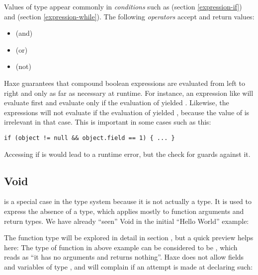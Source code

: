 Values of type  appear commonly in \emph{conditions} such as  (section \ref{expression-if}) and  (section \ref{expression-while}). The following \emph{operators} accept and return  values:
\begin{itemize}
	\item \expr{\&\&} (and)
	\item \expr{||} (or)
	\item \expr{!} (not)
\end{itemize}
Haxe guarantees that compound boolean expressions are evaluated from left to right and only as far as necessary at runtime. For instance, an expression like  will evaluate  first and evaluate  only if the evaluation of  yielded . Likewise, the expressions  will not evaluate  if the evaluation of  yielded , because the value of  is irrelevant in that case.
This is important in some cases such as this:

\begin{lstlisting}
if (object != null && object.field == 1) { ... }
\end{lstlisting}
Accessing  if  is  would lead to a runtime error, but the check for  guards against it.




\subsection{Void}
\label{types-void}


 is a special case in the type system because it is not actually a type. It is used to express the absence of a type, which applies mostly to function arguments and return types.
We have already ``seen'' Void in the initial ``Hello World'' example:

The function type will be explored in detail in section , but a quick preview helps here: The type of function  in above example can be considered to be , which reads as ``it has no arguments and returns nothing''.
Haxe does not allow fields and variables of type , and will complain if an attempt is made at declaring such:

